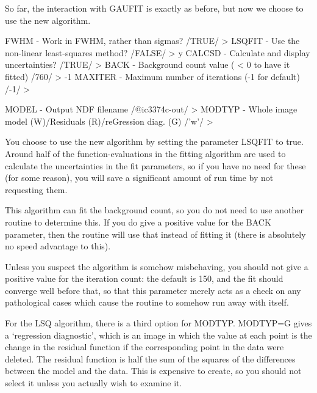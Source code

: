 \documentclass[twoside,11pt]{starlink}
\begin{document}
So far, the interaction with GAUFIT is exactly as before, but now we
choose to use the new algorithm.

\begin{terminalv}
FWHM - Work in FWHM, rather than sigmas? /TRUE/ >
LSQFIT - Use the non-linear least-squares method? /FALSE/ > y
CALCSD - Calculate and display uncertainties? /TRUE/ >
BACK - Background count value ( < 0 to have it fitted) /760/ > -1
MAXITER - Maximum number of iterations (-1 for default) /-1/ >

MODEL - Output NDF filename /@ic3374c-out/ >
MODTYP - Whole image model (W)/Residuals (R)/reGression diag. (G) /'w'/ >
\end{terminalv}

You choose to use the new algorithm by setting the parameter LSQFIT to
true.  Around half of the function-evaluations in the fitting
algorithm are used to calculate the uncertainties in the fit
parameters, so if you have no need for these (for some reason), you
will save a significant amount of run time by not requesting them.

This algorithm can fit the background count, so you do not need to use
another routine to determine this.  If you do give a positive value
for the BACK parameter, then the routine will use that instead of
fitting it (there is absolutely no speed advantage to this).

Unless you suspect the algorithm is somehow misbehaving, you should
not give a positive value for the iteration count: the default is 150,
and the fit should converge well before that, so that this parameter
merely acts as a check on any pathological cases which cause the
routine to somehow run away with itself.

For the LSQ algorithm, there is a third option for MODTYP.  MODTYP=G
gives a `regression diagnostic', which is an image in which the value
at each point is the change in the residual function if the
corresponding point in the data were deleted.  The residual function
is half the sum of the squares of the differences between the model
and the data.  This is expensive to create, so you should not
select it unless you actually wish to examine it.
\end{document}
